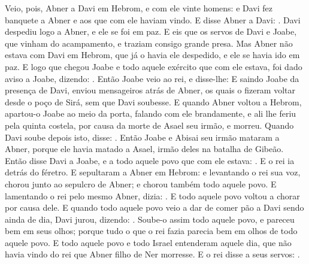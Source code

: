 {  Veio, pois, Abner a Davi em Hebrom, e com ele vinte homens: e Davi fez banquete a Abner e aos que com ele haviam vindo.
  E disse Abner a Davi: . Davi despediu logo a Abner, e ele se foi em paz.
  E eis que os servos de Davi e Joabe, que vinham do acampamento, e traziam consigo grande presa. Mas Abner não estava com Davi em Hebrom, que já o havia ele despedido, e ele se havia ido em paz.
  E logo que chegou Joabe e todo aquele exército que com ele estava, foi dado aviso a Joabe, dizendo: .
  Então Joabe veio ao rei, e disse-lhe: 
  E saindo Joabe da presença de Davi, enviou mensageiros atrás de Abner, os quais o fizeram voltar desde o poço de Sirá, sem que Davi soubesse.
  E quando Abner voltou a Hebrom, apartou-o Joabe ao meio da porta, falando com ele brandamente, e ali lhe feriu pela quinta costela, por causa da morte de Asael seu irmão, e morreu.
  Quando Davi soube depois isto, disse: .
  Então Joabe e Abisai seu irmão mataram a Abner, porque ele havia matado a Asael, irmão deles na batalha de Gibeão.
  Então disse Davi a Joabe, e a todo aquele povo que com ele estava: . E o rei ia detrás do féretro.
  E sepultaram a Abner em Hebrom: e levantando o rei sua voz, chorou junto ao sepulcro de Abner; e chorou também todo aquele povo.
  E lamentando o rei pelo mesmo Abner, dizia: . E todo aquele povo voltou a chorar por causa dele.
  E quando todo aquele povo veio a dar de comer pão a Davi sendo ainda de dia, Davi jurou, dizendo: .
  Soube-o assim todo aquele povo, e pareceu bem em seus olhos; porque tudo o que o rei fazia parecia bem em olhos de todo aquele povo.
  E todo aquele povo e todo Israel entenderam aquele dia, que não havia vindo do rei que Abner filho de Ner morresse.
  E o rei disse a seus servos: .
\par }

